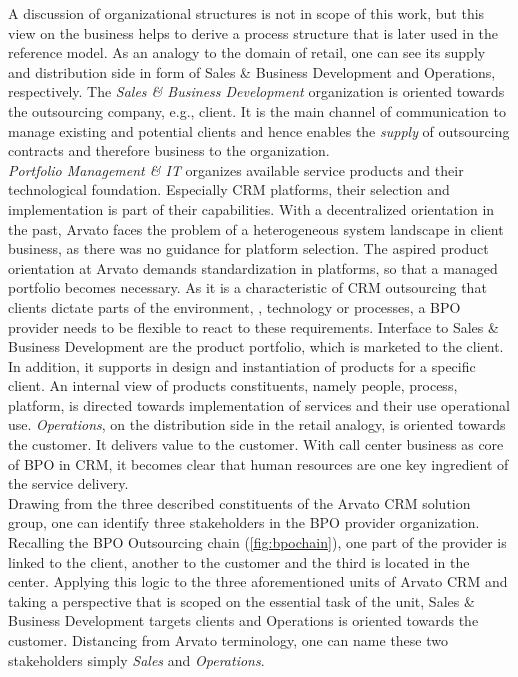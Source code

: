 A discussion of organizational structures is not in scope of this work, but this view on the business helps to derive a process structure that is later used in the reference model. As an analogy to the domain of retail, one can see its supply and distribution side in form of Sales \& Business Development and Operations, respectively. The \textit{Sales \& Business Development }organization is oriented towards the outsourcing company, e.g., client. It is the main channel of communication to manage existing and potential clients and hence enables the \textit{supply} of outsourcing contracts and therefore business to the organization.\\
 \textit{Portfolio Management \& IT} organizes available service products and their technological foundation. Especially CRM platforms, their selection and implementation is part of their capabilities. With a decentralized orientation in the past, Arvato faces the problem of a heterogeneous system landscape in client business, as there was no guidance for platform selection. The aspired product orientation at Arvato demands standardization in platforms, so that a managed portfolio becomes necessary. As it is a characteristic of CRM outsourcing that clients dictate parts of the environment, \eg, technology or processes, a BPO provider needs to be flexible to react to these requirements. Interface to Sales \& Business Development are the product portfolio, which is marketed to the client. In addition, it supports in design and instantiation of products for a specific client. An internal view of products constituents, namely people, process, platform, is directed towards implementation of services and their use operational use. 
  \textit{Operations}, on the distribution side in the retail analogy, is oriented towards the customer. It delivers value to the customer. With call center business as core of BPO in CRM, it becomes clear that human resources are one key ingredient of the service delivery.  \\
  
  Drawing from the three described constituents of the Arvato CRM solution group, one can identify three stakeholders in the BPO provider organization. Recalling the BPO Outsourcing chain (\Fig \ref{fig:bpochain}), one part of the provider is linked to the client, another to the customer and the third is located in the center. Applying this logic to the three aforementioned units of Arvato CRM and taking a perspective that is scoped on the essential task of the unit, Sales \& Business Development targets clients and Operations is oriented towards the customer. Distancing from Arvato terminology, one can name these two stakeholders simply \textit{Sales} and \textit{Operations}. \\
  
